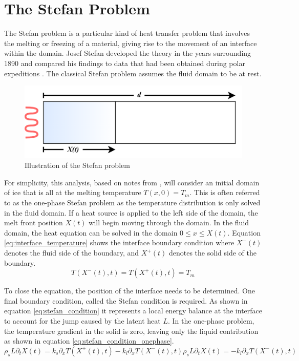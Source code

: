 \section{The Stefan Problem}
\label{chap:stefan_problem}
The Stefan problem is a particular kind of heat transfer problem that involves the melting or freezing of a material, giving rise to the movement of an interface within the domain. Josef Stefan developed the theory in the years surrounding 1890 and compared his findings to data that had been obtained during polar expeditions \cite{1889aSTEFAN}\cite{1889bSTEFAN}\cite{1889cSTEFAN}\cite{1891STEFAN}. The classical Stefan problem assumes the fluid domain to be at rest. 
\begin{figure}[ht]
	\centering
	\includegraphics[width=0.7\linewidth]{figures/chapter_2/StefanProblem.png}
	\caption{Illustration of the Stefan problem}
	\label{fig:stefan_problem}
\end{figure}

For simplicity, this analysis, based on notes from \cite{Kowalski_2022}, will consider an initial domain of ice that is all at the melting temperature $T(x,0) = T_m$. This is often referred to as the one-phase Stefan problem as the temperature distribution is only solved in the fluid domain. If a heat source is applied to the left side of the domain, the melt front position $X(t)$ will begin moving through the domain. In the fluid domain, the heat equation can be solved in the domain $0\leq x\leq X(t)$. Equation \ref{eq:interface_temperature} shows the interface boundary condition where $X^-(t)$ denotes the fluid side of the boundary, and $X^+(t)$ denotes the solid side of the boundary.
\begin{equation}
	T(X^-(t),t) = T(X^+(t),t) = T_m
	\label{eq:interface_temperature}
\end{equation}

To close the equation, the position of the interface needs to be determined. One final boundary condition, called the Stefan condition is required. As shown in equation \ref{eq:stefan_condition} it represents a local energy balance at the interface to account for the jump caused by the latent heat $L$. In the one-phase problem, the temperature gradient in the solid is zero, leaving only the liquid contribution as shown in equation \ref{eq:stefan_condition_onephase}.
\begin{subequations}
	\begin{equation}
		\rho_sL\partial_tX(t)=k_s\partial_xT(X^+(t),t) - k_l\partial_xT(X^-(t),t)
		\label{eq:stefan_condition}
	\end{equation}
	\begin{equation}
		\rho_sL\partial_tX(t)=- k_l\partial_xT(X^-(t),t)
		\label{eq:stefan_condition_onephase}
	\end{equation}
\end{subequations}

